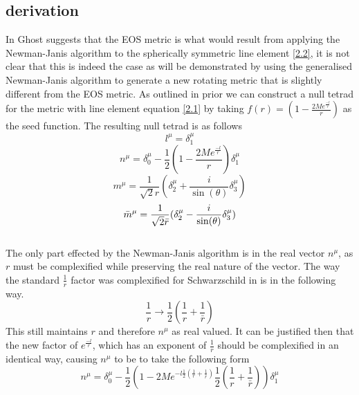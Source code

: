 \documentclass[12pt]{iopart}
\begin{document}
\subsection{derivation}
In \cite{Ghosh:2014pba} Ghost suggests that the EOS metric is what would result from applying the Newman-Janis algorithm to the spherically symmetric line element \ref{2.2}, it is not clear that this is indeed the case as will be demonstrated by using the generalised Newman-Janis algorithm to generate a new rotating metric that is slightly different from the EOS metric. As outlined in prior we can construct a null tetrad for the metric with line element equation \ref{2.1} by taking $f(r)=(1-\frac{2Me^{\frac{-l}{r}}}{r})$ as the seed function. The resulting null tetrad is as follows
 \begin{equation} 
 l^{\mu}=\delta^{\mu}_1
 \end{equation}
 \begin{equation}
 n^{\mu}=\delta^{\mu}_0-\frac{1}{2}(1-\frac{2Me^{\frac{-l}{r}}}{r})\delta^{\mu}_1
 \end{equation}
 \begin{equation}
 m^{\mu}=\frac{1}{\sqrt{2}r}(\delta^{\mu}_2+\frac{i}{\sin(\theta)}\delta^{\mu}_3)
 \end{equation}
 \begin{equation}
 \bar{m}^{\mu}=\frac{1}{\sqrt{2}\Bar{r}}(\delta^{\mu}_2-\frac{i}{\sin(\theta)}\delta^{\mu}_3)
 \end{equation}
 \\
 The only part effected by the Newman-Janis algorithm is in the real vector $n^{\mu}$, as $r$ must be complexified while preserving the real nature of the vector. The way the standard $\frac{1}{r}$ factor was complexified for Schwarzschild in \cite{Newman:1965tw} \cite{dInverno:1992gxs} \cite{Drake:1998gf} is in the following way.
 \begin{equation}
 \frac{1}{r} \rightarrow \frac{1}{2}(\frac{1}{r}+\frac{1}{\bar{r}})
 \end{equation}
 This still maintains $r$ and therefore $n^{\mu}$ as real valued. It can be justified then that the new factor of $e^{\frac{-l}{r}}$, which has an exponent of $\frac{1}{r}$ should be complexified in an identical way, causing $n^{\mu}$ to be to take the following form
 \\
 \begin{equation} 
 n^{\mu}=\delta^{\mu}_0-\frac{1}{2}(1-2Me^{-l\frac{1}{2}(\frac{1}{r}+\frac{1}{\bar{r}})}\frac{1}{2}(\frac{1}{r}+\frac{1}{\bar{r}}))\delta^{\mu}_1
 \end{equation}
\end{document}
